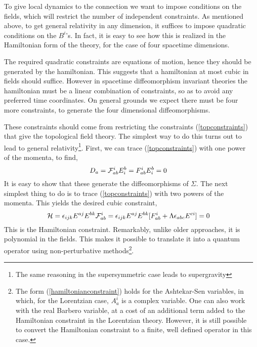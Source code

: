 \documentclass[12pt]{article}
\newcommand{\f}{\begin{equation}}
\newcommand{\ff}{\end{equation}}
\begin{document}
To give local dynamics to the connection we want to impose conditions on the fields, 
which will restrict the number of independent constraints.  As mentioned above, 
to get general relativity in any dimension, it suffices to impose quadratic  
conditions on the $B^i$'s.  In fact, it is easy to see how this is realized in the
Hamiltonian form of the theory, for the case of four spacetime dimensions. 

The required quadratic constraints are equations of motion, hence they should
be generated by the hamiltonian. This suggests that a hamiltonian at most cubic
in fields should suffice.  
However in spacetime diffeomorphism invariant theories the hamiltonian must be a linear
combination of constraints, so as to avoid any preferred time coordinates.  
On general grounds we expect there must be four more constraints, to generate
the four dimensional diffeomorphisms.  

These constraints
should come from restricting the constraints (\ref{topconstraints}) that give 
the topological field theory. The simplest way to do this turns out
to lead to general relativity\footnote{The same reasoning in the supersymmetric
case leads to supergravity}.  First, we can trace (\ref{topconstraints})
with one power of the momenta, to find,
\f
D_a = {\cal F}_{ab}^i  E_i^b = F_{ab}^i  E^b_i =0
\label{diffconstraint}
\ff
It is easy to show that these generate
the diffeomorphisms of $\Sigma$.   The next simplest thing to do is to
trace (\ref{topconstraints}) with two powers of the momenta. This yields
the desired cubic constraint, 
\f
{\cal H} = \epsilon_{ijk }E^{aj} E^{bk}  {\cal F}_{ab}^i  = \epsilon_{ijk } E^{aj} E^{bk}  [F_{ab}^i + 
\Lambda \epsilon_{abc} E^{c i}] =0
\label{hamiltonianconstraint}
\ff
This is the Hamiltonian constraint. Remarkably, unlike older approaches, it is polynomial in the fields. This makes it possible to translate it into a quantum operator using non-perturbative
methods\footnote{The form (\ref{hamiltonianconstraint})  holds for the Ashtekar-Sen variables, 
in which, for the Lorentzian case, $A_a^i$ is a complex variable. One can also work
with the real Barbero variable, at a cost of an additional term added to the Hamiltonian
constraint in the Lorentzian theory. However, it is still possible to convert
the Hamiltonian constraint to a finite, well defined operator in this case.}.  
\end{document}
